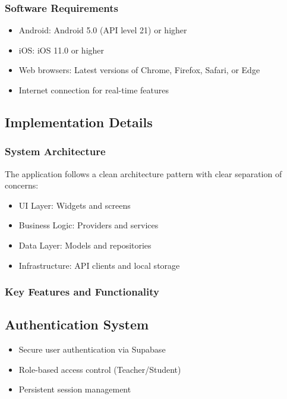 \subsubsection{Software Requirements}
\begin{itemize}
    \item Android: Android 5.0 (API level 21) or higher
    \item iOS: iOS 11.0 or higher
    \item Web browsers: Latest versions of Chrome, Firefox, Safari, or Edge
    \item Internet connection for real-time features
\end{itemize}

\subsection{Implementation Details}

\subsubsection{System Architecture}
The application follows a clean architecture pattern with clear separation of concerns:
\begin{itemize}
    \item UI Layer: Widgets and screens
    \item Business Logic: Providers and services
    \item Data Layer: Models and repositories
    \item Infrastructure: API clients and local storage
\end{itemize}

\subsubsection{Key Features and Functionality}

\subsection{Authentication System}\nopagebreak[4]
\begin{itemize}
    \item Secure user authentication via Supabase
    \item Role-based access control (Teacher/Student)
    \item Persistent session management
\end{itemize}

